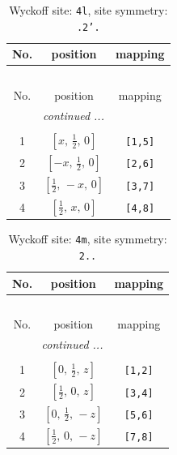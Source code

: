 \documentclass[fleqn,8pt]{jsarticle}
\begin{document}
\renewcommand{\arraystretch}{1.2}
\begin{longtable}{ccc}
\caption{Wyckoff site: {\tt 4l}, site symmetry: {\tt .2'.}}
 \\
 \hline \hline
No. & position & mapping \\ \hline \endfirsthead

\multicolumn{2}{l}{\tablename\ \thetable{}} \\
 \hline \hline
No. & position & mapping \\ \hline \endhead

 \hline \hline
\multicolumn{2}{r}{\footnotesize\it continued ...} \\ \endfoot

 \hline \hline
\multicolumn{2}{r}{} \\ \endlastfoot

1 & $\left[ x,\, \frac{1}{2},\, 0 \right]$ & {\tt [1,5]} \\ \hline
2 & $\left[ - x,\, \frac{1}{2},\, 0 \right]$ & {\tt [2,6]} \\ \hline
3 & $\left[ \frac{1}{2},\, - x,\, 0 \right]$ & {\tt [3,7]} \\ \hline
4 & $\left[ \frac{1}{2},\, x,\, 0 \right]$ & {\tt [4,8]} \\
\end{longtable}
\renewcommand{\arraystretch}{1.2}
\begin{longtable}{ccc}
\caption{Wyckoff site: {\tt 4m}, site symmetry: {\tt 2..}}
 \\
 \hline \hline
No. & position & mapping \\ \hline \endfirsthead

\multicolumn{2}{l}{\tablename\ \thetable{}} \\
 \hline \hline
No. & position & mapping \\ \hline \endhead

 \hline \hline
\multicolumn{2}{r}{\footnotesize\it continued ...} \\ \endfoot

 \hline \hline
\multicolumn{2}{r}{} \\ \endlastfoot

1 & $\left[ 0,\, \frac{1}{2},\, z \right]$ & {\tt [1,2]} \\ \hline
2 & $\left[ \frac{1}{2},\, 0,\, z \right]$ & {\tt [3,4]} \\ \hline
3 & $\left[ 0,\, \frac{1}{2},\, - z \right]$ & {\tt [5,6]} \\ \hline
4 & $\left[ \frac{1}{2},\, 0,\, - z \right]$ & {\tt [7,8]} \\
\end{longtable}
\end{document}
